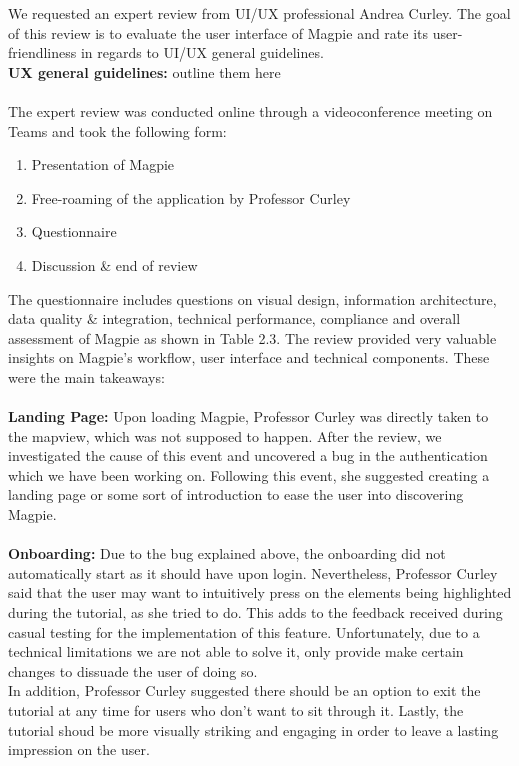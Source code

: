 We requested an expert review from UI/UX professional Andrea Curley. The goal of this review is to evaluate the user interface of Magpie and rate its user-friendliness in regards to UI/UX general guidelines.\\
\textbf{UX general guidelines: } outline them here \\ \\
The expert review was conducted online through a videoconference meeting on Teams and took the following form:
\begin{enumerate}
    \item Presentation of Magpie
    \item Free-roaming of the application by Professor Curley
    \item Questionnaire
    \item Discussion \& end of review
\end{enumerate}
The questionnaire includes questions on visual design, information architecture, data quality \& integration, technical performance, compliance and overall assessment of Magpie as shown in Table 2.3. The review provided very valuable insights on Magpie's workflow, user interface and technical components. These were the main takeaways:\\ \\
\textbf{Landing Page: }
Upon loading Magpie, Professor Curley was directly taken to the mapview, which was not supposed to happen. After the review, we investigated the cause of this event and uncovered a bug in the authentication which we have been working on. Following this event, she suggested creating a landing page or some sort of introduction to ease the user into discovering Magpie.\\ \\
\textbf{Onboarding: }
Due to the bug explained above, the onboarding did not automatically start as it should have upon login. Nevertheless, Professor Curley said that the user may want to intuitively press on the elements being highlighted during the tutorial, as she tried to do. This adds to the feedback received during casual testing for the implementation of this feature. Unfortunately, due to a technical limitations we are not able to solve it, only provide make certain changes to dissuade the user of doing so.\\
In addition, Professor Curley suggested there should be an option to exit the tutorial at any time for users who don't want to sit through it. Lastly, the tutorial shoud be more visually striking and engaging in order to leave a lasting impression on the user.\\ \\
